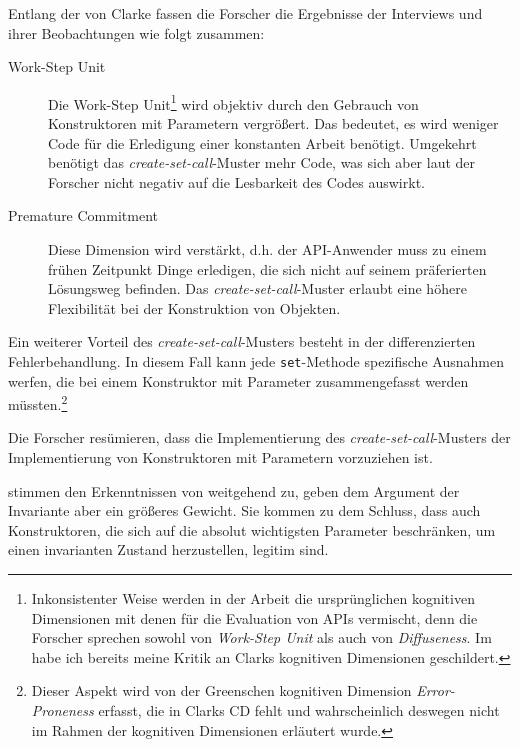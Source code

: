 Entlang der  von Clarke \cite[][siehe ]{Anonymous:9HSMlhmF} fassen die Forscher die Ergebnisse der Interviews und ihrer Beobachtungen wie folgt zusammen:
\begin{description}
  \item[Work-Step Unit] Die Work-Step Unit\footnote{Inkonsistenter Weise werden in der Arbeit die ursprünglichen kognitiven Dimensionen \citep{Green:1989wb} mit denen für die Evaluation von APIs \citep{Anonymous:9HSMlhmF} vermischt, denn die Forscher sprechen sowohl von \textit{Work-Step Unit} als auch von \textit{Diffuseness}. Im  habe ich bereits meine Kritik an Clarks kognitiven Dimensionen geschildert.} wird objektiv durch den Gebrauch von Konstruktoren mit Parametern vergrößert. Das bedeutet, es wird weniger Code für die Erledigung einer konstanten Arbeit benötigt. Umgekehrt benötigt das \textit{create-set-call}-Muster mehr Code, was sich aber laut der Forscher  nicht negativ auf die Lesbarkeit des Codes auswirkt.
  \item[Premature Commitment] Diese Dimension wird verstärkt, d.h. der API-Anwender muss zu einem frühen Zeitpunkt Dinge erledigen, die sich nicht auf seinem präferierten Lösungsweg befinden. Das \textit{create-set-call}-Muster erlaubt eine höhere Flexibilität bei der Konstruktion von Objekten.
\end{description}

Ein weiterer Vorteil des \textit{create-set-call}-Musters besteht in der differenzierten Fehlerbehandlung. In diesem Fall kann jede \texttt{set}-Methode spezifische Ausnahmen werfen, die bei einem Konstruktor mit Parameter zusammengefasst werden müssten.\footnote{Dieser Aspekt wird von der Greenschen kognitiven Dimension \textit{Error-Proneness} erfasst, die in Clarks CD fehlt und wahrscheinlich deswegen nicht im Rahmen der kognitiven Dimensionen erläutert wurde.}

Die Forscher resümieren, dass die Implementierung des \textit{create-set-call}-Musters der Implementierung von Konstruktoren mit Parametern vorzuziehen ist.

\cite{Piccioni:2013uq} stimmen den Erkenntnissen von \cite{Stylos:2007jb} weitgehend zu, geben dem Argument der Invariante aber ein größeres Gewicht. Sie kommen zu dem Schluss, dass auch Konstruktoren, die sich auf die absolut wichtigsten Parameter beschränken, um einen invarianten Zustand herzustellen, legitim sind.





